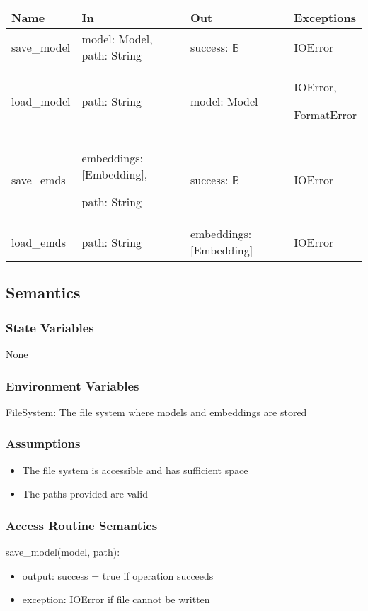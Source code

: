 \documentclass[12pt, titlepage]{article}
\begin{document}
\begin{center}
\begin{tabular}{p{2cm} p{4cm} p{4cm} p{2cm}}
\hline
\textbf{Name} & \textbf{In} & \textbf{Out} & \textbf{Exceptions} \\
\hline
save\_model & model: Model, path: String & success: $\mathbb{B}$ & IOError \\
\hline
load\_model & path: String & model: Model & IOError,

FormatError \\
\hline
save\_emds & embeddings: [Embedding],

path: String & success: $\mathbb{B}$ & IOError \\
\hline
load\_emds & path: String & embeddings: [Embedding] & IOError \\
\hline
\end{tabular}
\end{center}

\subsection{Semantics}

\subsubsection{State Variables}
None

\subsubsection{Environment Variables}

FileSystem: The file system where models and embeddings are stored

\subsubsection{Assumptions}

\begin{itemize}
  \item The file system is accessible and has sufficient space
  \item The paths provided are valid
\end{itemize}

\subsubsection{Access Routine Semantics}

\noindent save\_model(model, path):
\begin{itemize}
\item output:  success = true if operation succeeds
\item exception: IOError if file cannot be written
\end{itemize}
\end{document}
